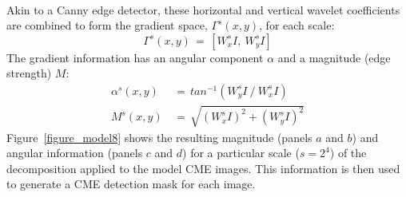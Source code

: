 \documentclass[namedreferences]{SolarPhysics}
\begin{document}
\begin{article}
\begin{eqnarray}
\end{eqnarray}
Akin to a Canny edge detector, these horizontal and vertical wavelet coefficients are combined to form the gradient space, $\Gamma^s(x,y)$, for each scale: 
\begin{equation}
\Gamma^s (x,y)\, = \,\left[W_{x}^s I,~W_{y}^s I \right]
\end{equation}
The gradient information has an angular component $\alpha$ and a magnitude (edge strength) $M$:
\begin{eqnarray}
\alpha^s(x,y) \, &= \, tan^{-1}\left( W_{y}^s I~/~W_{x}^s I \right) \\
M^s(x,y) \, &= \, \sqrt{ ( W_{x}^s I ) ^2 + ( W_{y}^s I ) ^2 }
\end{eqnarray}
Figure~\ref{figure_model8} shows the resulting magnitude (panels $a$ and $b$) and angular information (panels $c$ and $d$) for a particular scale ($s=2^{4}$) of the decomposition applied to the model CME images. This information is then used to generate a CME detection mask for each image.



\end{article}
\end{document}
